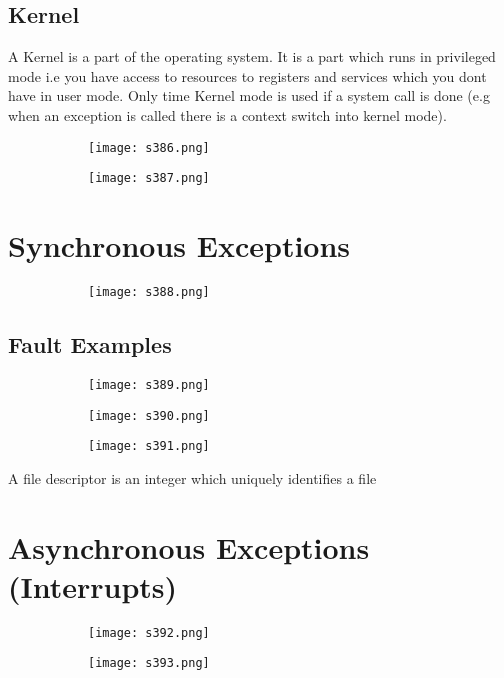 \documentclass[8pt]{extreport}
\begin{document}
\subsection{Kernel}

A Kernel is a part of the operating system. It is a part which runs in privileged mode i.e you have access to resources to registers and services which you dont have in user mode. Only time Kernel mode is used if a system call is done (e.g when an exception is called there is a context switch into kernel mode).
\begin{figure}[H]
\begin{subfigure}[b]{0.4\linewidth}
\texttt{[image: s386.png]}
\end{subfigure}
\begin{subfigure}[b]{0.4\linewidth}
\texttt{[image: s387.png]}
\end{subfigure}
\end{figure}

\section{Synchronous Exceptions}
\begin{figure}[H]
\begin{subfigure}[b]{0.4\linewidth}
\texttt{[image: s388.png]}
\end{subfigure}
\end{figure}
\subsection{Fault Examples}
\begin{figure}[H]
\begin{subfigure}[b]{0.4\linewidth}
\texttt{[image: s389.png]}
\end{subfigure}
\begin{subfigure}[b]{0.4\linewidth}
\texttt{[image: s390.png]}
\end{subfigure}
\begin{subfigure}[b]{0.4\linewidth}
\texttt{[image: s391.png]}
\end{subfigure}
\end{figure}
A file descriptor is an integer which uniquely identifies a file

\section{Asynchronous Exceptions (Interrupts)}
\begin{figure}[H]
\begin{subfigure}[b]{0.4\linewidth}
\texttt{[image: s392.png]}
\end{subfigure}
\begin{subfigure}[b]{0.4\linewidth}
\texttt{[image: s393.png]}
\end{subfigure}
\end{figure}
\end{document}
